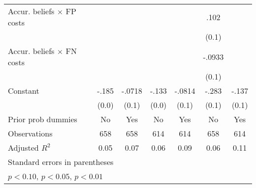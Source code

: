 \begin{table}[htbp]
\begin{tabular}{l*{6}{c}}
Accur. beliefs $\times$ FP costs&                  &                  &                  &                  &     .102         &                  \\
                &                  &                  &                  &                  &    (0.1)         &                  \\
Accur. beliefs $\times$ FN costs&                  &                  &                  &                  &   -.0933         &                  \\
                &                  &                  &                  &                  &    (0.1)         &                  \\
Constant        &    -.185\sym{***}&   -.0718         &    -.133\sym{***}&   -.0814         &    -.283\sym{***}&    -.137         \\
                &    (0.0)         &    (0.1)         &    (0.0)         &    (0.1)         &    (0.1)         &    (0.1)         \\
Prior prob dummies &       No         &      Yes         &       No         &      Yes         &       No         &      Yes         \\
\hline
Observations    &      658         &      658         &      614         &      614         &      658         &      614         \\
Adjusted \(R^{2}\)&     0.05         &     0.07         &     0.06         &     0.09         &     0.06         &     0.11         \\
\hline\hline
\multicolumn{7}{l}{\footnotesize Standard errors in parentheses}\\
\multicolumn{7}{l}{\footnotesize \sym{*} \(p<0.10\), \sym{**} \(p<0.05\), \sym{***} \(p<0.01\)}\\
\end{tabular}
\end{table}
